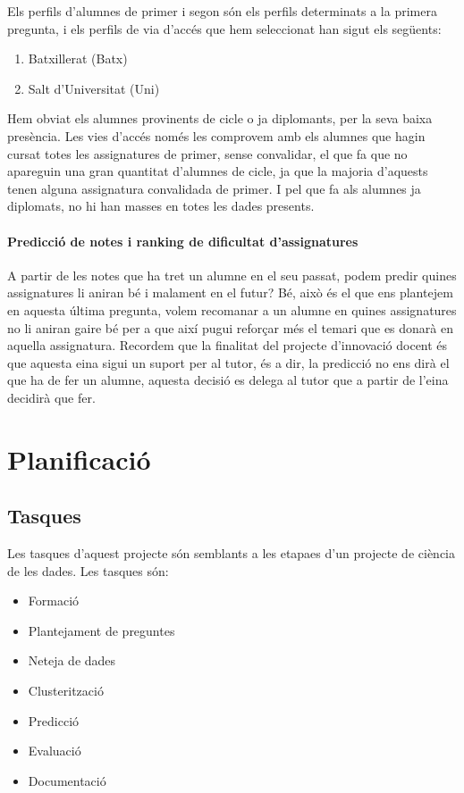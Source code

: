 \documentclass[12pt,a4paper,catalan]{article}
\begin{document}
Els perfils d'alumnes de primer i segon són els perfils determinats a la primera pregunta, i els perfils de via d'accés que hem seleccionat han sigut els següents:
\begin{enumerate}
	\item Batxillerat (Batx)
	\item Salt d'Universitat (Uni)
\end{enumerate}

Hem obviat els alumnes provinents de cicle o ja diplomants, per la seva baixa presència. Les vies d'accés només les comprovem amb els alumnes que hagin cursat totes les assignatures de primer, sense convalidar, el que fa que no apareguin una gran quantitat d'alumnes de cicle, ja que la majoria d'aquests tenen alguna assignatura convalidada de primer. I pel que fa als alumnes ja diplomats, no hi han masses en totes les dades presents.

\paragraph{Predicció de notes i ranking de dificultat d'assignatures}
A partir de les notes que ha tret un alumne en el seu passat, podem predir quines assignatures li aniran bé i malament en el futur? Bé, això és el que ens plantejem en aquesta última pregunta, volem recomanar a un alumne en quines assignatures no li aniran gaire bé per a que així pugui reforçar més el temari que es donarà en aquella assignatura. Recordem que la finalitat del projecte d'innovació docent és que aquesta eina sigui un suport per al tutor, és a dir, la predicció no ens dirà el que ha de fer un alumne, aquesta decisió es delega al tutor que a partir de l'eina decidirà que fer.
\newpage

\section{Planificació}
\subsection{Tasques}
Les tasques d'aquest projecte són semblants a les etapaes d'un projecte de ciència de les dades. Les tasques són:
\begin{itemize}[leftmargin=.5in]
	\item Formació
	\item Plantejament de preguntes
	\item Neteja de dades
	\item Clusterització
	\item Predicció
	\item Evaluació
	\item Documentació
\end{itemize}
\end{document}
